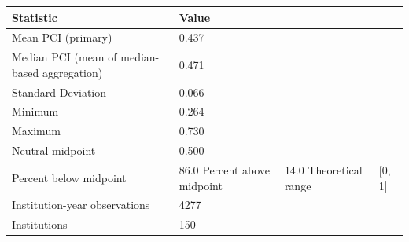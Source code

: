 \begin{tabular}{ll}
\toprule
Statistic & Value \\
\midrule
Mean PCI (primary) & 0.437 \\
Median PCI (mean of median-based aggregation) & 0.471 \\
Standard Deviation & 0.066 \\
Minimum & 0.264 \\
Maximum & 0.730 \\
Neutral midpoint & 0.500 \\
Percent below midpoint & 86.0%
Percent above midpoint & 14.0%
Theoretical range & [0, 1] \\
Institution-year observations & 4277 \\
Institutions & 150 \\
\bottomrule
\end{tabular}
